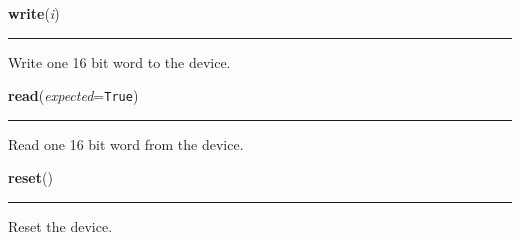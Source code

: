     \label{ociw:write}

    \vspace{0.5ex}

    \begin{boxedminipage}{\textwidth}

    \raggedright \textbf{write}(\textit{i})

    \vspace{-1.5ex}

    \rule{\textwidth}{0.5\fboxrule}
    Write one 16 bit word to the device.

    \vspace{1ex}

    \end{boxedminipage}

    \label{ociw:read}

    \vspace{0.5ex}

    \begin{boxedminipage}{\textwidth}

    \raggedright \textbf{read}(\textit{expected}=\texttt{True})

    \vspace{-1.5ex}

    \rule{\textwidth}{0.5\fboxrule}
    Read one 16 bit word from the device.

    \vspace{1ex}

    \end{boxedminipage}

    \label{ociw:reset}

    \vspace{0.5ex}

    \begin{boxedminipage}{\textwidth}

    \raggedright \textbf{reset}()

    \vspace{-1.5ex}

    \rule{\textwidth}{0.5\fboxrule}
    Reset the device.

    \vspace{1ex}

    \end{boxedminipage}

    \label{ociw:command}

